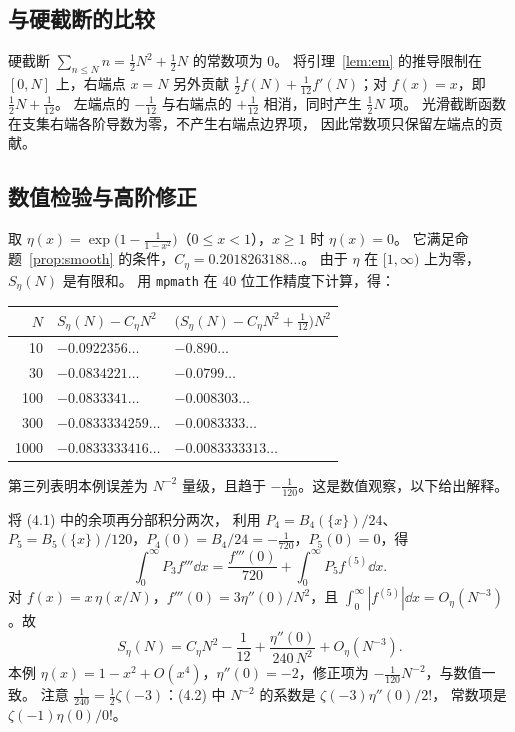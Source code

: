 \documentclass[11pt]{article}
\begin{document}
\subsection{与硬截断的比较}
硬截断 $\sum_{n\le N}n=\tfrac12N^2+\tfrac12N$ 的常数项为 $0$。
将引理~\ref{lem:em} 的推导限制在 $[0,N]$ 上，右端点 $x=N$ 另外贡献
$\tfrac12f(N)+\tfrac1{12}f'(N)$；对 $f(x)=x$，即 $\tfrac12N+\tfrac1{12}$。
左端点的 $-\tfrac1{12}$ 与右端点的 $+\tfrac1{12}$ 相消，同时产生 $\tfrac12N$ 项。
光滑截断函数在支集右端各阶导数为零，不产生右端点边界项，
因此常数项只保留左端点的贡献。

\subsection{数值检验与高阶修正}
取 $\eta(x)=\exp\bigl(1-\tfrac1{1-x^2}\bigr)$（$0\le x<1$），$x\ge1$ 时 $\eta(x)=0$。
它满足命题~\ref{prop:smooth} 的条件，$C_\eta=0.2018263188\ldots$。
由于 $\eta$ 在 $[1,\infty)$ 上为零，$S_\eta(N)$ 是有限和。
用 \texttt{mpmath} 在 40 位工作精度下计算，得：
\begin{center}
\begin{tabular}{rll}
\toprule
$N$ & $S_\eta(N)-C_\eta N^2$ & $\bigl(S_\eta(N)-C_\eta N^2+\tfrac1{12}\bigr)N^2$\\
\midrule
10   & $-0.0922356\ldots$ & $-0.890\ldots$\\
30   & $-0.0834221\ldots$ & $-0.0799\ldots$\\
100  & $-0.0833341\ldots$ & $-0.008303\ldots$\\
300  & $-0.0833334259\ldots$ & $-0.0083333\ldots$\\
1000 & $-0.0833333416\ldots$ & $-0.0083333313\ldots$\\
\bottomrule
\end{tabular}
\end{center}
第三列表明本例误差为 $N^{-2}$ 量级，且趋于 $-\tfrac1{120}$。这是数值观察，以下给出解释。

将 (4.1) 中的余项再分部积分两次，
利用 $P_4=B_4(\{x\})/24$、$P_5=B_5(\{x\})/120$，$P_4(0)=B_4/24=-\tfrac1{720}$，$P_5(0)=0$，得
\[
 \int_0^\infty P_3f'''\dd x=\frac{f'''(0)}{720}+\int_0^\infty P_5f^{(5)}\dd x .
\]
对 $f(x)=x\,\eta(x/N)$，$f'''(0)=3\eta''(0)/N^2$，且 $\int_0^\infty|f^{(5)}|\dd x=O_\eta(N^{-3})$。故
\[
 S_\eta(N)=C_\eta N^2-\frac1{12}+\frac{\eta''(0)}{240\,N^2}+O_\eta(N^{-3}).   \tag{4.2}
\]
本例 $\eta(x)=1-x^2+O(x^4)$，$\eta''(0)=-2$，修正项为 $-\tfrac1{120}N^{-2}$，与数值一致。
注意 $\tfrac1{240}=\tfrac12\zeta(-3)$：(4.2) 中 $N^{-2}$ 的系数是 $\zeta(-3)\eta''(0)/2!$，
常数项是 $\zeta(-1)\eta(0)/0!$。
\end{document}
